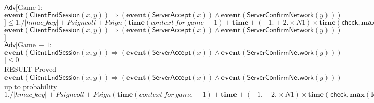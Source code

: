 \documentclass{article}
\newcommand{\kw}[1]{\mathbf{#1}}
\newcommand{\kwf}[1]{\mathsf{#1}}
\newcommand{\var}[1]{\mathit{#1}}
\newcommand{\kwt}[1]{\mathit{#1}}
\newcommand{\kwp}[1]{\mathit{#1}}
\begin{document}
$\mathsf{Adv}[\mathrm{Game}\ 1: $$\kw{event}(\kwf{ClientEndSession}(\var{x}, \var{y})) \Longrightarrow (\kw{event}(\kwf{ServerAccept}(\var{x})) \wedge \kw{event}(\kwf{ServerConfirmNetwork}(\var{y})))$$] \leq 1. / |\kwt{hmac{\_}key}| + \var{Psigncoll} + \var{Psign}(\kw{time}(\mathit{context\ for\ game}\ -1) + \kw{time} + (-1. + 2. \times \kwp{N1}) \times \kw{time}(\kwf{check}, \kw{max}(\kw{length}((\kwt{hmac{\_}key}, \kwt{G}, \kwt{bitstring}), \allowbreak \kw{length}(\kwf{hash}, \allowbreak \kw{length}(\kwf{G2bit}))), \allowbreak \kw{length}((\kwt{hmac{\_}key}, \kwt{bitstring}, \kwt{G}, \kwt{bitstring}), \allowbreak \kw{maxlength}(\var{sign{\_}A}), \allowbreak \kw{length}(\kwf{hash}, \allowbreak \kw{length}(\kwf{G2bit})))), \allowbreak \kw{max}(\kw{maxlength}(\var{sign{\_}Y}), \allowbreak \kw{maxlength}(\var{sign{\_}B}))), \allowbreak \kwp{N1}, \allowbreak \kw{maxlength}(\var{m}_{4})) + \mathsf{Adv}[\mathrm{Game}\ -1: $$\kw{event}(\kwf{ClientEndSession}(\var{x}, \var{y})) \Longrightarrow (\kw{event}(\kwf{ServerAccept}(\var{x})) \wedge \kw{event}(\kwf{ServerConfirmNetwork}(\var{y})))$$]$\\
$\mathsf{Adv}[\mathrm{Game}\ -1: $$\kw{event}(\kwf{ClientEndSession}(\var{x}, \var{y})) \Longrightarrow (\kw{event}(\kwf{ServerAccept}(\var{x})) \wedge \kw{event}(\kwf{ServerConfirmNetwork}(\var{y})))$$] \leq 0$\\
RESULT Proved $\kw{event}(\kwf{ClientEndSession}(\var{x}, \var{y})) \Longrightarrow (\kw{event}(\kwf{ServerAccept}(\var{x})) \wedge \kw{event}(\kwf{ServerConfirmNetwork}(\var{y})))$ up to probability $1. / |\kwt{hmac{\_}key}| + \var{Psigncoll} + \var{Psign}(\kw{time}(\mathit{context\ for\ game}\ -1) + \kw{time} + (-1. + 2. \times \kwp{N1}) \times \kw{time}(\kwf{check}, \kw{max}(\kw{length}((\kwt{hmac{\_}key}, \kwt{G}, \kwt{bitstring}), \allowbreak \kw{length}(\kwf{hash}, \allowbreak \kw{length}(\kwf{G2bit}))), \allowbreak \kw{length}((\kwt{hmac{\_}key}, \kwt{bitstring}, \kwt{G}, \kwt{bitstring}), \allowbreak \kw{maxlength}(\var{sign{\_}A}), \allowbreak \kw{length}(\kwf{hash}, \allowbreak \kw{length}(\kwf{G2bit})))), \allowbreak \kw{max}(\kw{maxlength}(\var{sign{\_}Y}), \allowbreak \kw{maxlength}(\var{sign{\_}B}))), \allowbreak \kwp{N1}, \allowbreak \kw{maxlength}(\var{m}_{4}))$\\
\end{document}
